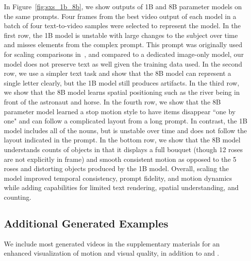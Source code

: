 In Figure~\ref{fig:sxs_1b_8b}, we show outputs of 1B and 8B parameter models on the same prompts.
Four frames from the best video output of each model in a batch of four text-to-video samples were selected to represent the model.
In the first row, the 1B model is unstable with large changes to the subject over time and misses elements from the complex prompt.
This prompt was originally used for scaling comparisons in~\cite{yu2022scaling}, and compared to a dedicated image-only model, our model does not preserve text as well given the training data used. In the second row, we use a simpler text task and show that the 8B model can represent a single letter clearly, but the 1B model still produces artifacts.
In the third row, we show that the 8B model learns spatial positioning such as the river being in front of the astronaut and horse. In the fourth row, we show that the 8B parameter model learned a stop motion style to have items disappear ``one by one" and can follow a complicated layout from a long prompt.
In contrast, the 1B model includes all of the nouns, but is unstable over time and does not follow the layout indicated in the prompt. In the bottom row, we show that the 8B model understands counts of objects in that it displays a full bouquet (though 12 roses are not explicitly in frame) and smooth consistent motion as opposed to the 5 roses and distorting objects produced by the 1B model. 
Overall, scaling the model improved temporal consistency, prompt fidelity, and motion dynamics while adding capabilities for limited text rendering, spatial understanding, and counting.


\subsection{Additional Generated Examples} 
We include most generated videos in the supplementary materials for an enhanced visualization of motion and visual quality, in addition to  and .

% 







